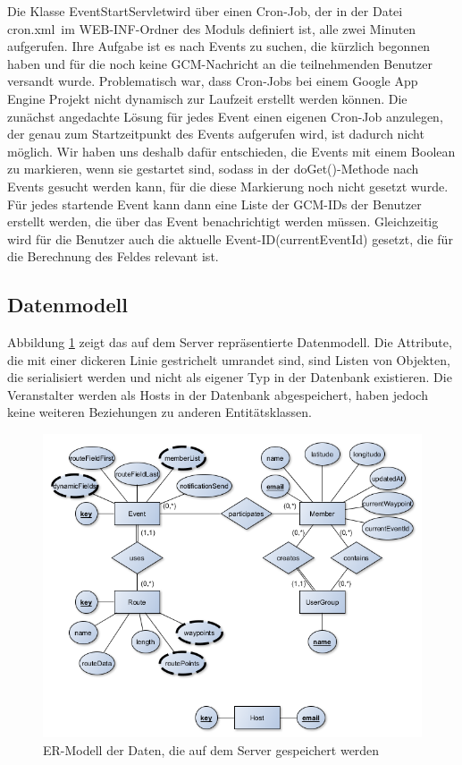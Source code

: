 Die Klasse \glqq EventStartServlet\grqq wird über einen Cron-Job, der in der Datei \glqq cron.xml\grqq\ im WEB-INF-Ordner des Moduls definiert ist, alle zwei Minuten aufgerufen. Ihre Aufgabe ist es nach Events zu suchen, die kürzlich begonnen haben und für die noch keine GCM-Nachricht an die teilnehmenden Benutzer versandt wurde. Problematisch war, dass Cron-Jobs bei einem Google App Engine Projekt nicht dynamisch zur Laufzeit erstellt werden können. Die zunächst angedachte Lösung für jedes Event einen eigenen Cron-Job anzulegen, der genau zum Startzeitpunkt des Events aufgerufen wird, ist dadurch nicht möglich. Wir haben uns deshalb dafür entschieden, die Events mit einem Boolean zu markieren, wenn sie gestartet sind, sodass in der \glqq doGet()\grqq -Methode nach Events gesucht werden kann, für die diese Markierung noch nicht gesetzt wurde. Für jedes startende Event kann dann eine Liste der GCM-IDs der Benutzer erstellt werden, die über das Event benachrichtigt werden müssen. Gleichzeitig wird für die Benutzer auch die aktuelle Event-ID(\glqq currentEventId\grqq) gesetzt, die für die Berechnung des Feldes relevant ist.

\subsection{Datenmodell}
Abbildung \ref{fig:backend_er} zeigt das auf dem Server repräsentierte Datenmodell. Die Attribute, die mit einer dickeren Linie gestrichelt umrandet sind, sind Listen von Objekten, die serialisiert werden und nicht als eigener Typ in der Datenbank existieren. Die Veranstalter werden als Hosts in der Datenbank abgespeichert, haben jedoch keine weiteren Beziehungen zu anderen Entitätsklassen.

\begin{figure}[htb]
\includegraphics[width=\textwidth]{graphics/backend_er.png}
\caption{ER-Modell der Daten, die auf dem Server gespeichert werden}
\label{fig:backend_er}
\end{figure}

